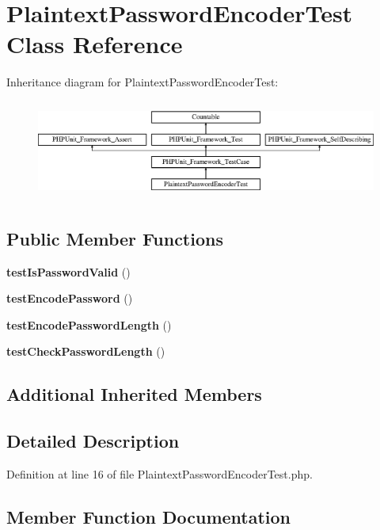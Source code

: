 \section{Plaintext\+Password\+Encoder\+Test Class Reference}
\label{class_symfony_1_1_component_1_1_security_1_1_core_1_1_tests_1_1_encoder_1_1_plaintext_password_encoder_test}
Inheritance diagram for Plaintext\+Password\+Encoder\+Test\+:\begin{figure}[H]
\begin{center}
\leavevmode
\includegraphics[height=3.303835cm]{class_symfony_1_1_component_1_1_security_1_1_core_1_1_tests_1_1_encoder_1_1_plaintext_password_encoder_test}
\end{center}
\end{figure}
\subsection*{Public Member Functions}
\begin{DoxyCompactItemize}
\item 
{\bf test\+Is\+Password\+Valid} ()
\item 
{\bf test\+Encode\+Password} ()
\item 
{\bf test\+Encode\+Password\+Length} ()
\item 
{\bf test\+Check\+Password\+Length} ()
\end{DoxyCompactItemize}
\subsection*{Additional Inherited Members}


\subsection{Detailed Description}


Definition at line 16 of file Plaintext\+Password\+Encoder\+Test.\+php.



\subsection{Member Function Documentation}
